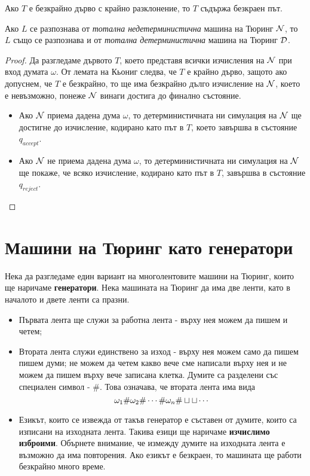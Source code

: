 \begin{prop}
  Ако $T$ е безкрайно дърво с крайно разклонение, то $T$ съдържа безкраен път.
\end{prop}

\begin{cor}
  Ако $L$ се разпознава от {\em тотална недетерминистична} машина на Тюринг $\mathcal{N}$, то $L$
  също се разпознава и от {\em тотална детерминистична} машина на Тюринг $\mathcal{D}$.
\end{cor}
\begin{proof}
  Да разгледаме дървото $T$, което представя всички изчисления на $\mathcal{N}$ при вход думата $\omega$.
  От лемата на Кьониг следва, че $T$ е крайно дърво, защото ако допуснем, че $T$ е безкрайно, то ще има безкрайно дълго изчисление на $\mathcal{N}$,
  което е невъзможно, понеже $\mathcal{N}$ винаги достига до финално състояние.
  \begin{itemize}
  \item 
    Ако $\mathcal{N}$ приема дадена дума $\omega$, то детерминистичната ни симулация на $\mathcal{N}$ ще достигне до изчисление, кодирано като път в $T$, 
    което завършва в състояние $q_{accept}$.
  \item
    Ако $\mathcal{N}$ не приема дадена дума $\omega$, то детерминистичната ни симулация на $\mathcal{N}$ ще покаже, че всяко изчисление, кодирано като път в $T$, завършва в състояние $q_{reject}$.
  \end{itemize}
\end{proof}


\section{Машини на Тюринг като генератори}


Нека да разгледаме един вариант на многолентовите машини на Тюринг, които ще наричаме {\bf генератори}.
Нека машината на Тюринг да има две ленти, като в началото и двете ленти са празни.
\begin{itemize}
\item 
  Първата лента ще служи за работна лента - върху нея можем да пишем и четем;
\item
  Втората лента служи единствено за изход - върху нея можем само да пишем пишем думи; не можем да четем какво вече сме написали върху нея и не можем да пишем върху вече записана клетка. Думите са разделени със специален символ - $\#$.
  Това означава, че втората лента има вида
  \[\omega_1\#\omega_2\#\cdots\#\omega_n\#\sqcup\sqcup\cdots\]
\item
  Езикът, които се извежда от такъв генератор е съставен от думите, които са изписани на изходната лента.
  Такива езици ще наричаме {\bf изчислимо изброими}.
  Обърнете внимание, че измежду думите на изходната лента е възможно да има повторения.
  Ако езикът е безкраен, то машината ще работи безкрайно много време.
\end{itemize}

